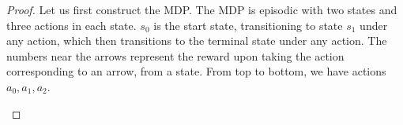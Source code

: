 \documentclass[\main/thesis.tex]{subfiles}
\begin{document}
\begin{proof}
Let us first construct the MDP. The MDP is episodic with two states and three actions in each state. $s_0$ is the start state, transitioning to state $s_1$ under any action, which then transitions to the terminal state under any action. The numbers near the arrows represent the reward upon taking the action corresponding to an arrow, from a state. From top to bottom, we have actions $a_0, a_1, a_2$. 

\begin{center}
\end{center}
%


\end{proof}
\end{document}
